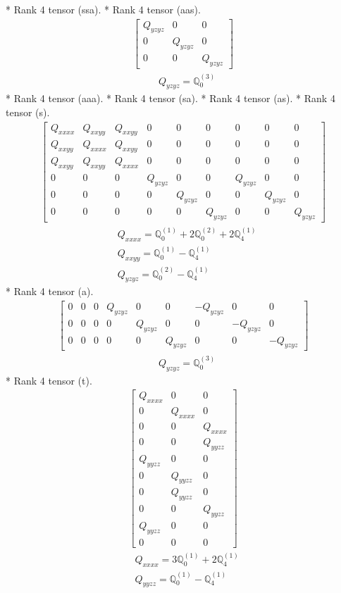 \documentclass[fleqn,8pt,landscape]{jsarticle}
\begin{document}
* Rank 4 tensor (ssa).
* Rank 4 tensor (aas).
\begin{align*}
\begin{bmatrix} Q_{yzyz} & 0 & 0 \\ 0 & Q_{yzyz} & 0 \\ 0 & 0 & Q_{yzyz} \end{bmatrix}
\end{align*}
\begin{align*}
& Q_{yzyz} = \mathbb{Q}_{0}^{(3)}
\end{align*}
* Rank 4 tensor (aaa).
* Rank 4 tensor (sa).
* Rank 4 tensor (as).
* Rank 4 tensor (s).
\begin{align*}
\begin{bmatrix} Q_{xxxx} & Q_{xxyy} & Q_{xxyy} & 0 & 0 & 0 & 0 & 0 & 0 \\ Q_{xxyy} & Q_{xxxx} & Q_{xxyy} & 0 & 0 & 0 & 0 & 0 & 0 \\ Q_{xxyy} & Q_{xxyy} & Q_{xxxx} & 0 & 0 & 0 & 0 & 0 & 0 \\ 0 & 0 & 0 & Q_{yzyz} & 0 & 0 & Q_{yzyz} & 0 & 0 \\ 0 & 0 & 0 & 0 & Q_{yzyz} & 0 & 0 & Q_{yzyz} & 0 \\ 0 & 0 & 0 & 0 & 0 & Q_{yzyz} & 0 & 0 & Q_{yzyz} \end{bmatrix}
\end{align*}
\begin{align*}
& Q_{xxxx} = \mathbb{Q}_{0}^{(1)} + 2 \mathbb{Q}_{0}^{(2)} + 2 \mathbb{Q}_{4}^{(1)} \\
& Q_{xxyy} = \mathbb{Q}_{0}^{(1)} - \mathbb{Q}_{4}^{(1)} \\
& Q_{yzyz} = \mathbb{Q}_{0}^{(2)} - \mathbb{Q}_{4}^{(1)}
\end{align*}
* Rank 4 tensor (a).
\begin{align*}
\begin{bmatrix} 0 & 0 & 0 & Q_{yzyz} & 0 & 0 & - Q_{yzyz} & 0 & 0 \\ 0 & 0 & 0 & 0 & Q_{yzyz} & 0 & 0 & - Q_{yzyz} & 0 \\ 0 & 0 & 0 & 0 & 0 & Q_{yzyz} & 0 & 0 & - Q_{yzyz} \end{bmatrix}
\end{align*}
\begin{align*}
& Q_{yzyz} = \mathbb{Q}_{0}^{(3)}
\end{align*}
* Rank 4 tensor (t).
\begin{align*}
\begin{bmatrix} Q_{xxxx} & 0 & 0 \\ 0 & Q_{xxxx} & 0 \\ 0 & 0 & Q_{xxxx} \\ 0 & 0 & Q_{yyzz} \\ Q_{yyzz} & 0 & 0 \\ 0 & Q_{yyzz} & 0 \\ 0 & Q_{yyzz} & 0 \\ 0 & 0 & Q_{yyzz} \\ Q_{yyzz} & 0 & 0 \\ 0 & 0 & 0 \end{bmatrix}
\end{align*}
\begin{align*}
& Q_{xxxx} = 3 \mathbb{Q}_{0}^{(1)} + 2 \mathbb{Q}_{4}^{(1)} \\
& Q_{yyzz} = \mathbb{Q}_{0}^{(1)} - \mathbb{Q}_{4}^{(1)}
\end{align*}
\end{document}
